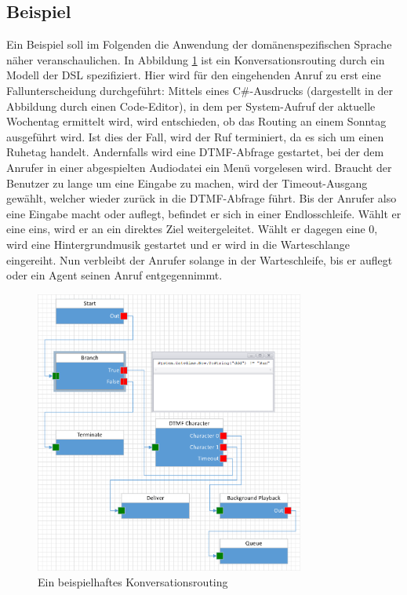 \subsection{Beispiel}
Ein Beispiel soll im Folgenden die Anwendung der domänenspezifischen Sprache näher veranschaulichen. In Abbildung \ref{fig:ExampleRouting} ist ein Konversationsrouting durch ein Modell der DSL spezifiziert. Hier wird für den eingehenden Anruf zu erst eine Fallunterscheidung durchgeführt: Mittels eines C\#-Ausdrucks (dargestellt in der Abbildung durch einen Code-Editor), in dem per System-Aufruf der aktuelle Wochentag ermittelt wird, wird entschieden, ob das Routing an einem Sonntag ausgeführt wird. Ist dies der Fall, wird der Ruf terminiert, da es sich um einen Ruhetag handelt. Andernfalls wird eine DTMF-Abfrage gestartet, bei der dem Anrufer in einer abgespielten Audiodatei ein Menü vorgelesen wird. Braucht der Benutzer zu lange um eine Eingabe zu machen, wird der Timeout-Ausgang gewählt, welcher wieder zurück in die DTMF-Abfrage führt. Bis der Anrufer also eine Eingabe macht oder auflegt, befindet er sich in einer Endlosschleife. Wählt er eine eins, wird er an ein direktes Ziel weitergeleitet. Wählt er dagegen eine 0, wird eine Hintergrundmusik gestartet und er wird in die Warteschlange eingereiht. Nun verbleibt der Anrufer solange in der Warteschleife, bis er auflegt oder ein Agent seinen Anruf entgegennimmt.  

\begin{figure} %
	\centering
		\includegraphics[width=0.79\textwidth]{img/ExampleRoutingRaw.png}
	\caption[Beispiel für ein Konversationsrouting]{Ein beispielhaftes Konversationsrouting}
	\label{fig:ExampleRouting}
\end{figure}

